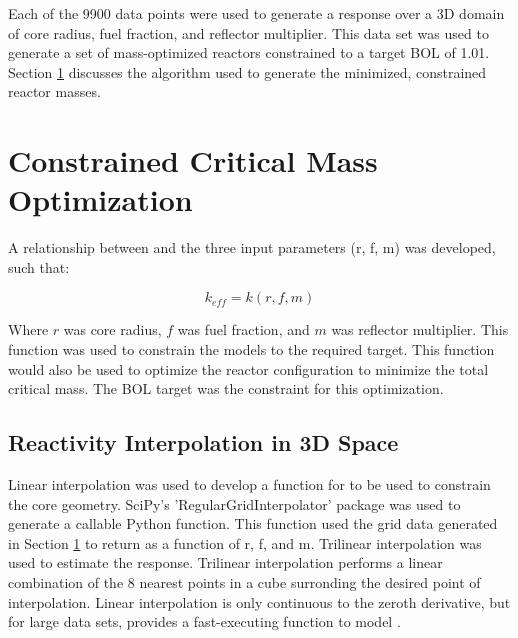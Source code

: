 Each of the 9900 data points were used to generate a \keff response over a 3D
domain of core radius, fuel fraction, and reflector multiplier. This data set was used to
generate a set of mass-optimized reactors constrained to a target BOL \keff of
1.01. Section \ref{sec:crit_rad_search} discusses the algorithm used to generate
the minimized, constrained reactor masses.

\section{Constrained Critical Mass Optimization}\label{sec:crit_rad_search}
A relationship between \keff and the three input
parameters (r, f, m) was developed, such that:

\begin{equation}
    k_{eff} = k(r, f, m)
\label{eq:gen_keff}
\end{equation}

Where $r$ was core radius, $f$ was fuel fraction, and $m$ was reflector multiplier. This
function was used to constrain the models to the required \keff target.
This function would also be used to optimize the reactor configuration to
minimize the total critical mass. The BOL \keff target was the constraint for
this optimization.

\subsection{Reactivity Interpolation in 3D Space}
Linear interpolation was used to develop a function for \keff to be used to
constrain the core geometry. SciPy's 'RegularGridInterpolator' package was used
to generate a callable Python function. This function used the grid data
generated in Section \ref{sec:crit_rad_search} to return \keff as a function of
r, f, and m. Trilinear interpolation was used to estimate the \keff response.
Trilinear interpolation performs a linear combination of the 8 nearest points in
a cube surronding the desired point of interpolation. Linear interpolation is
only continuous to the zeroth derivative, but for large data sets, provides a
fast-executing function to model \keff.

